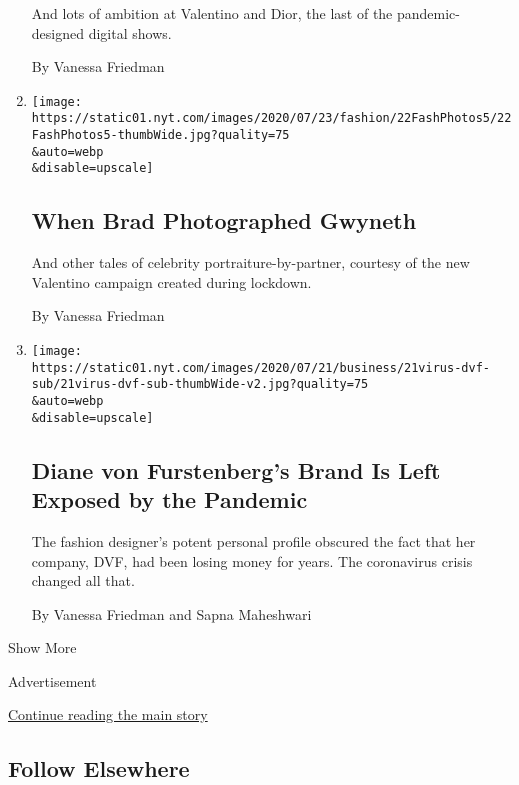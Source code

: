 \begin{enumerate}
  And lots of ambition at Valentino and Dior, the last of the
  pandemic-designed digital shows.

  By Vanessa Friedman
\item
  \href{/2020/07/22/style/gwyneth-paltrow-valentino-ad-campaign.html}{}

  \texttt{[image: https://static01.nyt.com/images/2020/07/23/fashion/22FashPhotos5/22FashPhotos5-thumbWide.jpg?quality=75\\\&auto=webp\\\&disable=upscale]}

  \hypertarget{when-brad-photographed-gwyneth}{%
  \subsection{When Brad Photographed
  Gwyneth}\label{when-brad-photographed-gwyneth}}

  And other tales of celebrity portraiture-by-partner, courtesy of the
  new Valentino campaign created during lockdown.

  By Vanessa Friedman
\item
  \href{/2020/07/22/business/diane-von-furstenberg-coronavirus-crisis.html}{}

  \texttt{[image: https://static01.nyt.com/images/2020/07/21/business/21virus-dvf-sub/21virus-dvf-sub-thumbWide-v2.jpg?quality=75\\\&auto=webp\\\&disable=upscale]}

  \hypertarget{diane-von-furstenbergs-brand-is-left-exposed-by-the-pandemic}{%
  \subsection{Diane von Furstenberg's Brand Is Left Exposed by the
  Pandemic}\label{diane-von-furstenbergs-brand-is-left-exposed-by-the-pandemic}}

  The fashion designer's potent personal profile obscured the fact that
  her company, DVF, had been losing money for years. The coronavirus
  crisis changed all that.

  By Vanessa Friedman and Sapna Maheshwari
\end{enumerate}

Show More

Advertisement

\protect\hyperlink{after-mid2}{Continue reading the main story}

\hypertarget{follow-elsewhere}{%
\subsection{Follow Elsewhere}\label{follow-elsewhere}}

